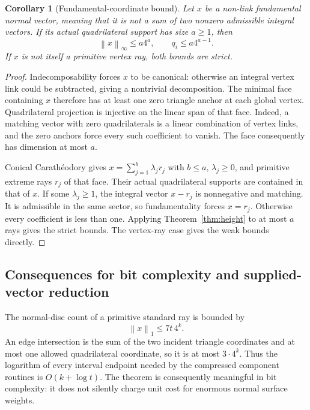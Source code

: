 \documentclass[11pt]{article}
\newtheorem{corollary}[theorem]{Corollary}
\theoremstyle{definition}
\theoremstyle{remark}
\newcommand{\norm}[1]{\left\lVert#1\right\rVert}
\begin{document}
\begin{corollary}[Fundamental-coordinate bound]
\label{cor:fundamental}
Let $x$ be a non-link fundamental normal vector, meaning that it is not a sum
of two nonzero admissible integral vectors. If its actual quadrilateral
support has size $a\ge1$, then
\begin{equation}
 \norm{x}_\infty\le a4^a,
 \qquad q_i\le a4^{a-1}.
 \label{eq:fundamentalheight}
\end{equation}
If $x$ is not itself a primitive vertex ray, both bounds are strict.
\end{corollary}
\begin{proof}
Indecomposability forces $x$ to be canonical: otherwise an integral vertex
link could be subtracted, giving a nontrivial decomposition. The minimal face
containing $x$ therefore has at least one zero triangle anchor at each global
vertex. Quadrilateral projection is injective on the linear span of that
face. Indeed, a matching vector with zero quadrilaterals is a linear
combination of vertex links, and the zero anchors force every such coefficient
to vanish. The face consequently has dimension at most $a$.

Conical Carath\'eodory gives
$x=\sum_{j=1}^{b}\lambda_jr_j$ with $b\le a$, $\lambda_j\ge0$, and primitive
extreme rays $r_j$ of that face. Their actual quadrilateral supports are
contained in that of $x$. If some $\lambda_j\ge1$, the integral vector
$x-r_j$ is nonnegative and matching. It is admissible in the same sector,
so fundamentality forces $x=r_j$. Otherwise every coefficient is less than
one. Applying Theorem~\ref{thm:height} to at most $a$ rays gives the strict
bounds. The vertex-ray case gives the weak bounds directly.
\end{proof}

\subsection{Consequences for bit complexity and supplied-vector reduction}

The normal-disc count of a primitive standard ray is bounded by
\begin{equation}
 \norm{x}_1\le7t\,4^k.
 \label{eq:l1bound}
\end{equation}
An edge intersection is the sum of the two incident triangle coordinates
and at most one allowed quadrilateral coordinate, so it is at most $3\cdot4^k$.
Thus the logarithm of every interval endpoint needed by the compressed
component routines is $O(k+\log t)$. The theorem is consequently meaningful
in bit complexity: it does not silently charge unit cost for enormous normal
surface weights.
\end{document}
